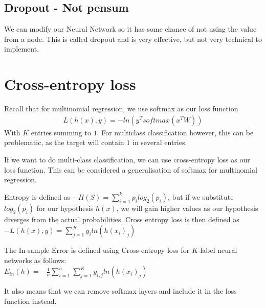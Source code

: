\documentclass{article}
\begin{document}
  \subsection{Dropout - Not pensum}
    We can modify our Neural Network so it has some chance of not using the value from a node. This is called dropout and is very effective, but not very technical to implement.

\section{Cross-entropy loss}

    Recall that for multinomial regression, we use softmax as our loss function 
    \begin{align}
      L(h(x), y) = -ln(y^T softmax(x^TW))
    \end{align}
    With $K$ entries summing to $1$. For multiclass classification however, this can be problematic, as the target will contain $1$ in several entries. 

    If we want to do multi-class classification, we can use cross-entropy loss as our loss function. This can be considered a generalisation of softmax for multinomial regression. 

    Entropy is defined as $-H(S) = \sum_{i=1}^{k}{p_i log_2(p_i)}$, but if we substitute $log_2(p_i)$ for our hypothesis $h(x)$, we will gain higher values as our hypothesis diverges from the actual probabilities. Cross entropy loss is then defined as $-L(h(x), y) = \sum_{j=1}^K y_{i}ln(h(x_i)_j)$

    The In-sample Error is defined using Cross-entropy loss for $K$-label neural networks as follows:\\
    $E_{in}(h) = -\frac{1}{n}\sum_{i=1}^n\sum_{j=1}^K y_{i,j}ln(h(x_i)_j)$

    It also means that we can remove softmax layers and include it in the loss function instead. 
\end{document}
